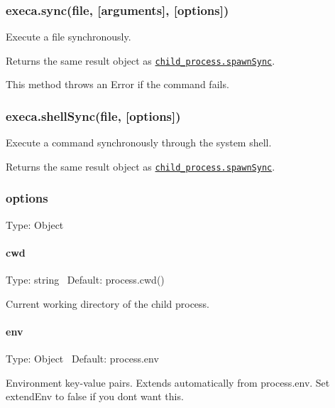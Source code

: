 \subsubsection*{execa.\+sync(file, \mbox{[}arguments\mbox{]}, \mbox{[}options\mbox{]})}

Execute a file synchronously.

Returns the same result object as \href{https://nodejs.org/api/child_process.html#child_process_child_process_spawnsync_command_args_options}{\tt {\ttfamily child\+\_\+process.\+spawn\+Sync}}.

This method throws an {\ttfamily Error} if the command fails.

\subsubsection*{execa.\+shell\+Sync(file, \mbox{[}options\mbox{]})}

Execute a command synchronously through the system shell.

Returns the same result object as \href{https://nodejs.org/api/child_process.html#child_process_child_process_spawnsync_command_args_options}{\tt {\ttfamily child\+\_\+process.\+spawn\+Sync}}.

\subsubsection*{options}

Type\+: {\ttfamily Object}

\paragraph*{cwd}

Type\+: {\ttfamily string}~\newline
 Default\+: {\ttfamily process.\+cwd()}

Current working directory of the child process.

\paragraph*{env}

Type\+: {\ttfamily Object}~\newline
 Default\+: {\ttfamily process.\+env}

Environment key-\/value pairs. Extends automatically from {\ttfamily process.\+env}. Set {\ttfamily extend\+Env} to {\ttfamily false} if you don\textquotesingle{}t want this.

